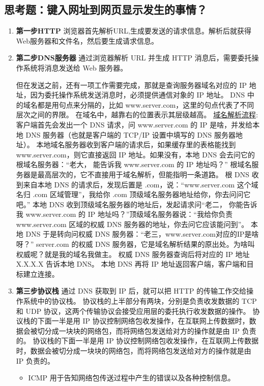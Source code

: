 \documentclass[11pt]{article}
\begin{document}
\subsection{思考题：键入网址到网页显示发生的事情？}
\label{sec:orgb7f2390}
\begin{enumerate}
\item \textbf{第一步HTTP}
浏览器首先解析URL,生成要发送的请求信息。解析后就获得Web服务器和文件名，然后要生成请求信息。
\item \textbf{第二步DNS服务器}
通过浏览器解析 URL 并生成 HTTP 消息后，需要委托操作系统将消息发送给 Web 服务器。

但在发送之前，还有一项工作需要完成，那就是查询服务器域名对应的 IP 地址，因为委托操作系统发送消息时，必须提供通信对象的 IP 地址。
DNS 中的域名都是用句点来分隔的，比如 www.server.com，这里的句点代表了不同层次之间的界限。
在域名中，越靠右的位置表示其层级越高。
\uline{域名解析流程}:
客户端首先会发出一个 DNS 请求，问 www.server.com 的 IP 是啥，并发给本地 DNS 服务器（也就是客户端的 TCP/IP 设置中填写的 DNS 服务器地址）。
本地域名服务器收到客户端的请求后，如果缓存里的表格能找到 www.server.com，则它直接返回 IP 地址。如果没有，本地 DNS 会去问它的根域名服务器：“老大， 能告诉我 www.server.com 的 IP 地址吗？” 根域名服务器是最高层次的，它不直接用于域名解析，但能指明一条道路。
根 DNS 收到来自本地 DNS 的请求后，发现后置是 .com，说：“www.server.com 这个域名归 .com 区域管理”，我给你 .com 顶级域名服务器地址给你，你去问问它吧。”
本地 DNS 收到顶级域名服务器的地址后，发起请求问“老二， 你能告诉我 www.server.com 的 IP 地址吗？”顶级域名服务器说：“我给你负责 www.server.com 区域的权威 DNS 服务器的地址，你去问它应该能问到”。
本地 DNS 于是转向问权威 DNS 服务器：“老三，www.server.com对应的IP是啥呀？” server.com 的权威 DNS 服务器，它是域名解析结果的原出处。为啥叫权威呢？就是我的域名我做主。
权威 DNS 服务器查询后将对应的 IP 地址 X.X.X.X 告诉本地 DNS。
本地 DNS 再将 IP 地址返回客户端，客户端和目标建立连接。
\item \textbf{第三步协议栈}
通过 DNS 获取到 IP 后，就可以把 HTTP 的传输工作交给操作系统中的协议栈。
协议栈的上半部分有两块，分别是负责收发数据的 TCP 和 UDP 协议，这两个传输协议会接受应用层的委托执行收发数据的操作。
协议栈的下面一半是用 IP 协议控制网络包收发操作，在互联网上传数据时，数据会被切分成一块块的网络包，而将网络包发送给对方的操作就是由 IP 负责的。
协议栈的下面一半是用 IP 协议控制网络包收发操作，在互联网上传数据时，数据会被切分成一块块的网络包，而将网络包发送给对方的操作就是由 IP 负责的。
\begin{itemize}
\item ICMP 用于告知网络包传送过程中产生的错误以及各种控制信息。

\end{itemize}
\end{enumerate}
\end{document}
